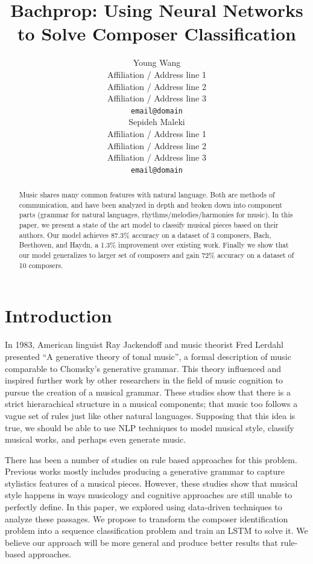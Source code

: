 \documentclass[11pt,a4paper]{article}
\title{Bachprop: Using Neural Networks to Solve Composer Classification}
\author{Young Wang \\
  Affiliation / Address line 1 \\
  Affiliation / Address line 2 \\
  Affiliation / Address line 3 \\
  {\tt email@domain} \\\And
  Sepideh Maleki \\
  Affiliation / Address line 1 \\
  Affiliation / Address line 2 \\
  Affiliation / Address line 3 \\
  {\tt email@domain} \\}
\date{}
\begin{document}
\maketitle
\begin{abstract}
Music shares many common features with natural language. Both are methods of communication, and have been analyzed in depth and broken down into component parts (grammar for natural languages, rhythms/melodies/harmonies for music). In this paper, we present a state of the art model to classify musical pieces based on their authors. Our model achieves 87.3\% accuracy on a dataset of 3 composers, Bach, Beethoven, and Haydn, a 1.3\% improvement over existing work. Finally we show that our model generalizes to larger set of composers and gain 72\% accuracy on a dataset of 10 composers.
\end{abstract}

\section{Introduction}


In 1983, American linguist Ray Jackendoff and music theorist Fred Lerdahl presented ``A generative theory of tonal music'', a formal description of music comparable to Chomsky's generative grammar. This theory influenced and inspired further work by other researchers in the field of music cognition to pursue the creation of a musical grammar. These studies show that there is a strict hierarachical structure in a musical components; that music too follows a vague set of rules just like other natural languages. Supposing that this idea is true, we should be able to use NLP techniques to model musical style, classify musical works, and perhaps even generate music.

There has been a number of studies on rule based approaches for this problem. Previous works mostly includes producing a generative grammar to capture stylistics features of a musical pieces. However, these studies show that musical style happens in ways musicology and cognitive approaches are still unable to perfectly define. In this paper, we explored using  data-driven techniques to analyze these passages. We propose to transform the composer identification problem into a sequence classification problem and train an LSTM to solve it.  We believe our approach will be more general and produce better results that rule-based approaches.
\end{document}
